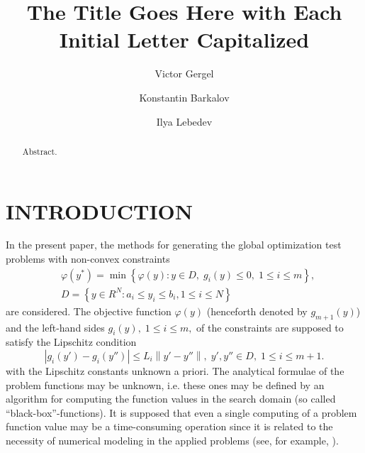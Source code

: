 \documentclass{aip-cp}
\begin{document}
\title{The Title Goes Here with Each Initial Letter Capitalized}

\author{Victor Gergel}
\author{Konstantin Barkalov}
\author{Ilya Lebedev}


\maketitle


\begin{abstract}
Abstract.
\end{abstract}

\section{INTRODUCTION}

In the present paper, the methods for generating the global optimization test problems with non-convex constraints
\begin{eqnarray}
&\varphi(y^\ast)=\min{\left\{\varphi(y):y\in D, \; g_i(y)\leq 0, \; 1 \leq i \leq m\right\}}, \label{i_problem} \\
&D=\left\{y\in R^N: a_i\leq y_i \leq b_i, 1\leq i \leq N\right\} \label{D}
\end{eqnarray}
are considered. The objective function $\varphi(y)$ (henceforth denoted by $g_{m+1}(y)$) and the left-hand sides $g_i(y), \; 1\leq i \leq m,$ of the constraints are supposed to satisfy the Lipschitz condition
\[ \left|g_i(y')-g_i (y'')\right| \leq L_i \left\|y'-y'' \right\|, \; y',y''\in D, \; 1\leq i \leq m+1. \]
with the Lipschitz constants unknown a priori. The analytical formulae of the problem functions may be unknown, i.e. these ones may be defined by an algorithm for computing the function values in the search domain (so called ``black-box''-functions). It is supposed that even a single computing of a problem function value may be a time-consuming operation since it is related to the necessity of numerical modeling in the applied problems (see, for example, \cite{Menniti2008,Kvasov2015,Modorskii2017}).
\end{document}
